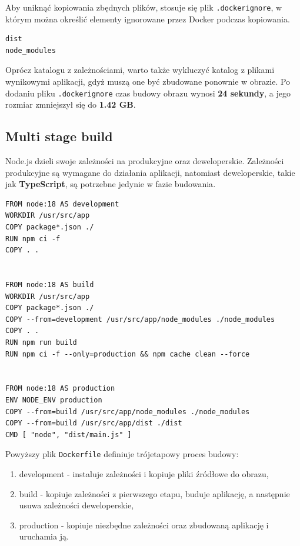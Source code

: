 \documentclass{article}
\begin{document}
Aby uniknąć kopiowania zbędnych plików, stosuje się plik \lstinline|.dockerignore|, w którym można określić elementy ignorowane przez Docker podczas kopiowania.

\begin{lstlisting}[caption=Plik .dockerignore]
dist
node_modules
\end{lstlisting}

Oprócz katalogu z zależnościami, warto także wykluczyć katalog z plikami wynikowymi aplikacji, gdyż muszą one być zbudowane ponownie w obrazie. Po dodaniu pliku \lstinline|.dockerignore| czas budowy obrazu wynosi \textbf{24 sekundy}, a jego rozmiar zmniejszył się do \textbf{1.42 GB}.

\subsection{Multi stage build}

Node.js dzieli swoje zależności na produkcyjne oraz deweloperskie. Zależności produkcyjne są wymagane do działania aplikacji, natomiast deweloperskie, takie jak \textbf{TypeScript}, są potrzebne jedynie w fazie budowania\cite{NodejsAviary}.

\begin{lstlisting}[caption=Multistage plik Dockerfile]
FROM node:18 AS development
WORKDIR /usr/src/app
COPY package*.json ./
RUN npm ci -f
COPY . .


FROM node:18 AS build
WORKDIR /usr/src/app
COPY package*.json ./
COPY --from=development /usr/src/app/node_modules ./node_modules
COPY . .
RUN npm run build
RUN npm ci -f --only=production && npm cache clean --force


FROM node:18 AS production
ENV NODE_ENV production
COPY --from=build /usr/src/app/node_modules ./node_modules
COPY --from=build /usr/src/app/dist ./dist
CMD [ "node", "dist/main.js" ]
\end{lstlisting}

Powyższy plik \lstinline|Dockerfile| definiuje trójetapowy proces budowy:

\begin{enumerate}
    \item development - instaluje zależności i kopiuje pliki źródłowe do obrazu,
    \item build - kopiuje zależności z pierwszego etapu, buduje aplikację, a następnie usuwa zależności deweloperskie,
    \item production - kopiuje niezbędne zależności oraz zbudowaną aplikację i uruchamia ją.
\end{enumerate}
\end{document}
